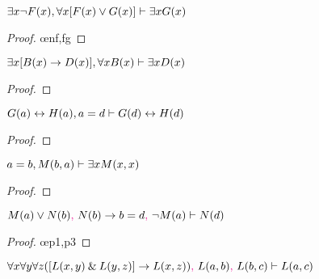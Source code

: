 \begin{earg}
\item $\exists x {\neg} F(x), \forall x[F(x) \vee G(x)] \vdash \exists xG(x)$

\begin{proof}
	 \pr{}
	 \pr{}
	\open
		 \as{}
		 
		 \oe{nf,fg}
		 
	\close
	 
\end{proof}
\bigskip

\begin{minipage}{10cm}
\item $\exists x[B(x) \rightarrow D(x)], \forall xB(x) \vdash \exists xD(x)$

\begin{proof}
	 \pr{}
	 \pr{}
	\open
		 \as{}
		 
		 
		 
	\close
	 
\end{proof}
\bigskip
\end{minipage}

\item $G(a) \leftrightarrow H(a), a=d \vdash G(d) \leftrightarrow H(d)$

\begin{proof}
	 \pr{}
	 \pr{}
	 
\end{proof}
\bigskip

\item $a=b, M(b,a) \vdash \exists xM(x,x)$

\begin{proof}
	 \pr{}
	 \pr{}
	 
	 
\end{proof}
\bigskip


\item $M(a) \vee N(b)\textcolor{magenta}{,}~ N(b) \rightarrow b=d\textcolor{magenta}{,}~ {\neg} M(a)  \vdash N(d)$

\begin{proof}
	 \pr{}
	 \pr{}
	 \pr{}
	 \oe{p1,p3}
	 
	 
\end{proof}
\bigskip


\item $\forall x \forall y \forall z([L(x,y) \mathbin{\&} L(y,z)] \rightarrow L(x,z))\textcolor{magenta}{,}~ L(a,b)\textcolor{magenta}{,}~ L(b,c) \vdash L(a,c)$
\end{earg}

